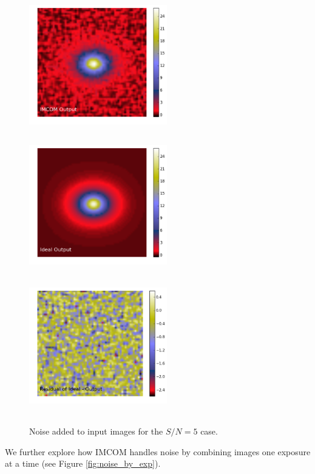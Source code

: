 \documentclass[12pt,preprint]{aastex6}
\begin{document}
\begin{figure}[!htbp]
\includegraphics[height=60mm,width=60mm]{f4f.png}
\includegraphics[height=60mm,width=60mm]{f4g.png}
\includegraphics[height=60mm,width=60mm]{f4h.png}
\caption{Noise added to input images for the $S/N=5$ case.}
\label{fig:noise}
\end{figure}


We further explore how IMCOM handles noise by combining images one exposure at a time (see Figure \ref{fig:noise_by_exp}). 
\end{document}

